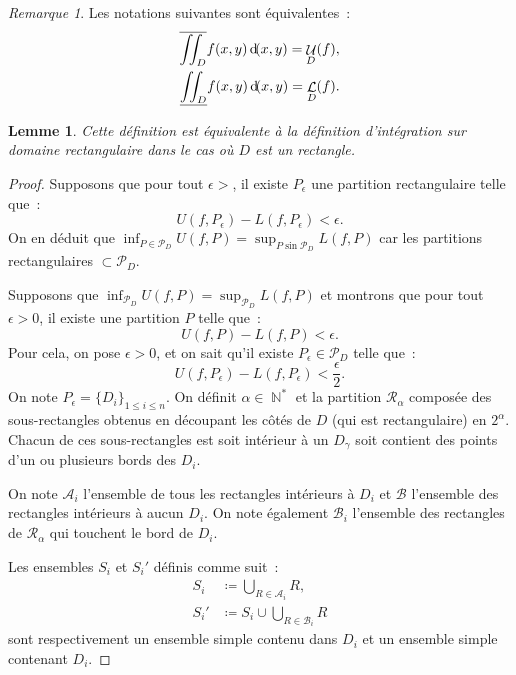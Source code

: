 \documentclass{article}
\DeclareMathOperator{\N}{\mathbb N}
\DeclareMathOperator{\Larea}{\mathcal L}
\DeclareMathOperator{\Uarea}{\mathcal U}
\newtheorem{lem}[thm]{Lemme}
\theoremstyle{definition}
\theoremstyle{remark}
\newtheorem*{rmq}{Remarque}
\begin{document}
		\begin{rmq} Les notations suivantes sont équivalentes~:
		\begin{align*}
			\overline{\iint_D}f(x, y)\dif (x, y) = \Uarea_D(f), \\
			\underline{\iint_D}f(x, y)\dif (x, y) = \Larea_D(f).
		\end{align*}
		\end{rmq}

		\begin{lem} Cette définition est équivalente à la définition d'intégration sur domaine rectangulaire dans le cas où $D$ est un rectangle.
		\end{lem}

		\begin{proof} Supposons que pour tout $\epsilon > $, il existe $P_\epsilon$ une partition rectangulaire telle que~:
		\[U(f, P_\epsilon) - L(f, P_\epsilon) < \epsilon.\]
		On en déduit que $\inf_{P \in \mathcal P_D}U(f, P) = \sup_{P \sin \mathcal P_D}L(f, P)$ car les partitions rectangulaires $\subset \mathcal P_D$.

		Supposons que $\inf_{\mathcal P_D}U(f, P) = \sup_{\mathcal P_D}L(f, P)$ et montrons que pour tout $\epsilon > 0$, il existe une partition $P$ telle que~:
		\[U(f, P) - L(f, P) < \epsilon.\]
		Pour cela, on pose $\epsilon > 0$, et on sait qu'il existe $P_\epsilon \in \mathcal P_D$ telle que~:
		\[U(f, P_\epsilon) - L(f, P_\epsilon) < \frac \epsilon 2.\]
		On note $P_\epsilon = \{D_i\}_{1 \leq i \leq n}$. On définit $\alpha \in \N^*$ et la partition $\mathcal R_\alpha$ composée des sous-rectangles obtenus
		en découpant les côtés de $D$ (qui est rectangulaire) en $2^\alpha$. Chacun de ces sous-rectangles est soit intérieur à un $D_\gamma$ soit contient des
		points d'un ou plusieurs bords des $D_i$.

		On note $\mathcal A_i$ l'ensemble de tous les rectangles intérieurs à $D_i$ et $\mathcal B$ l'ensemble des rectangles intérieurs à aucun $D_i$. On note
		également $\mathcal B_i$ l'ensemble des rectangles de $\mathcal R_\alpha$ qui touchent le bord de $D_i$.

		Les ensembles $S_i$ et $S_i'$ définis comme suit~:
		\begin{align*}
			S_i  &\coloneqq \bigcup_{R \in \mathcal A_i}R, \\
			S_i' &\coloneqq S_i \cup \bigcup_{R \in \mathcal B_i}R
		\end{align*}
		sont respectivement un ensemble simple contenu dans $D_i$ et un ensemble simple contenant $D_i$.


\end{proof}
\end{document}
